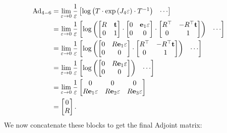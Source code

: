 \begin{align*}
\textnormal{Ad}_{4-6} & =\lim_{\varepsilon\to0}\frac{1}{\varepsilon}\begin{bmatrix}\log\left(T\cdot\exp\left(J_{4}\varepsilon\right)\cdot T^{-1}\right) & \cdots\end{bmatrix}\\
 & =\lim_{\varepsilon\to0}\frac{1}{\varepsilon}\begin{bmatrix}\log\left(\begin{bmatrix}R & \mathbf{t}\\
0 & 1
\end{bmatrix}\cdot\begin{bmatrix}0 & \mathbf{e}_{1}\varepsilon\\
0 & 0
\end{bmatrix}\cdot\begin{bmatrix}R^{\top} & -R^{\top}\mathbf{t}\\
0 & 1
\end{bmatrix}\right) & \cdots\end{bmatrix}\\
 & =\lim_{\varepsilon\to0}\frac{1}{\varepsilon}\begin{bmatrix}\log\left(\begin{bmatrix}0 & R\mathbf{e}_{1}\varepsilon\\
0 & 0
\end{bmatrix}\cdot\begin{bmatrix}R^{\top} & -R^{\top}\mathbf{t}\\
0 & 1
\end{bmatrix}\right) & \cdots\end{bmatrix}\\
 & =\lim_{\varepsilon\to0}\frac{1}{\varepsilon}\begin{bmatrix}\log\left(\begin{bmatrix}0 & R\mathbf{e}_{1}\varepsilon\\
0 & 0
\end{bmatrix}\right) & \cdots\end{bmatrix}\\
 & =\lim_{\varepsilon\to0}\frac{1}{\varepsilon}\begin{bmatrix}0 & 0 & 0\\
R\mathbf{e}_{1}\varepsilon & R\mathbf{e}_{2}\varepsilon & R\mathbf{e}_{3}\varepsilon
\end{bmatrix}\\
 & =\begin{bmatrix}0\\
R
\end{bmatrix}.
\end{align*}
We now concatenate these blocks to get the final Adjoint matrix:

